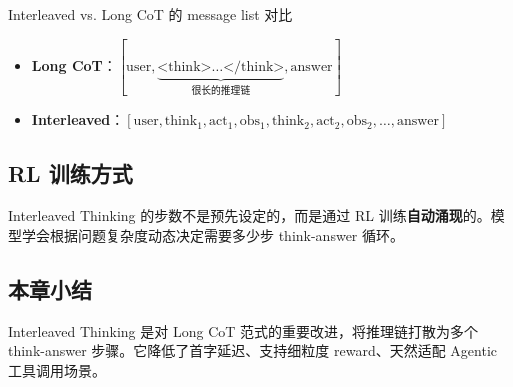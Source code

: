\begin{knowledgebox}{Interleaved vs. Long CoT 的 message list 对比}
\begin{itemize}
  \item \textbf{Long CoT}：$[\text{user}, \underbrace{\text{<think>}\ldots\text{</think>}}_{\text{很长的推理链}}, \text{answer}]$
  \item \textbf{Interleaved}：$[\text{user}, \text{think}_1, \text{act}_1, \text{obs}_1, \text{think}_2, \text{act}_2, \text{obs}_2, \ldots, \text{answer}]$
\end{itemize}
\end{knowledgebox}

\subsection{RL 训练方式}

Interleaved Thinking 的步数不是预先设定的，而是通过 RL 训练\textbf{自动涌现}的。模型学会根据问题复杂度动态决定需要多少步 think-answer 循环。

\subsection{本章小结}

Interleaved Thinking 是对 Long CoT 范式的重要改进，将推理链打散为多个 think-answer 步骤。它降低了首字延迟、支持细粒度 reward、天然适配 Agentic 工具调用场景。

